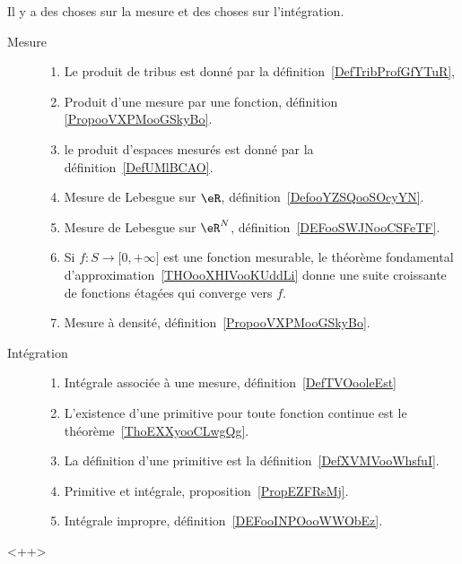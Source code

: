 
Il y a des choses sur la mesure et des choses sur l'intégration.
\begin{description}
    \item[Mesure] 

\begin{enumerate}

    \item Le produit de tribus est donné par la définition~\ref{DefTribProfGfYTuR},     %
    \item
        Produit d'une mesure par une fonction, définition \ref{PropooVXPMooGSkyBo}.
    \item le produit d'espaces mesurés est donné par la définition~\ref{DefUMlBCAO}.     %
        \item
            Mesure de Lebesgue sur \( \eR\), définition~\ref{DefooYZSQooSOcyYN}.
        \item
            Mesure de Lebesgue sur \( \eR^N\), définition~\ref{DEFooSWJNooCSFeTF}.
        \item

            Si \( f\colon S\to \mathopen[ 0 , +\infty \mathclose]\) est une fonction mesurable, le théorème fondamental d'approximation~\ref{THOooXHIVooKUddLi} donne une suite croissante de fonctions étagées qui converge vers \( f\).
        \item
            Mesure à densité, définition~\ref{PropooVXPMooGSkyBo}.
\end{enumerate}
\item[Intégration]
    \begin{enumerate}
        \item
            Intégrale associée à une mesure, définition~\ref{DefTVOooleEst}
    \item
        L'existence d'une primitive pour toute fonction continue est le théorème~\ref{ThoEXXyooCLwgQg}.
    \item
        La définition d'une primitive est la définition~\ref{DefXVMVooWhsfuI}.
    \item
        Primitive et intégrale, proposition~\ref{PropEZFRsMj}.
    \item
        Intégrale impropre, définition~\ref{DEFooINPOooWWObEz}.
\end{enumerate}
            
\end{description}
<++>

